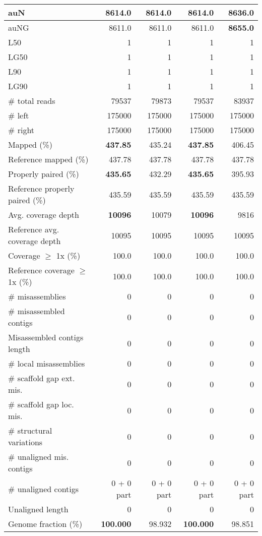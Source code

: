 \documentclass[12pt,a4paper]{article}
\begin{document}
\begin{table}[ht]
\begin{center}
\begin{tabular}{|l*{4}{|r}|}
auN & 8614.0 & 8614.0 & 8614.0 & {\bf 8636.0} \\ \hline
auNG & 8611.0 & 8611.0 & 8611.0 & {\bf 8655.0} \\ \hline
L50 & 1 & 1 & 1 & 1 \\ \hline
LG50 & 1 & 1 & 1 & 1 \\ \hline
L90 & 1 & 1 & 1 & 1 \\ \hline
LG90 & 1 & 1 & 1 & 1 \\ \hline
\# total reads & 79537 & 79873 & 79537 & 83937 \\ \hline
\# left & 175000 & 175000 & 175000 & 175000 \\ \hline
\# right & 175000 & 175000 & 175000 & 175000 \\ \hline
Mapped (\%) & {\bf 437.85} & 435.24 & {\bf 437.85} & 406.45 \\ \hline
Reference mapped (\%) & 437.78 & 437.78 & 437.78 & 437.78 \\ \hline
Properly paired (\%) & {\bf 435.65} & 432.29 & {\bf 435.65} & 395.93 \\ \hline
Reference properly paired (\%) & 435.59 & 435.59 & 435.59 & 435.59 \\ \hline
Avg. coverage depth & {\bf 10096} & 10079 & {\bf 10096} & 9816 \\ \hline
Reference avg. coverage depth & 10095 & 10095 & 10095 & 10095 \\ \hline
Coverage $\geq$ 1x (\%) & 100.0 & 100.0 & 100.0 & 100.0 \\ \hline
Reference coverage $\geq$ 1x (\%) & 100.0 & 100.0 & 100.0 & 100.0 \\ \hline
\# misassemblies & 0 & 0 & 0 & 0 \\ \hline
\# misassembled contigs & 0 & 0 & 0 & 0 \\ \hline
Misassembled contigs length & 0 & 0 & 0 & 0 \\ \hline
\# local misassemblies & 0 & 0 & 0 & 0 \\ \hline
\# scaffold gap ext. mis. & 0 & 0 & 0 & 0 \\ \hline
\# scaffold gap loc. mis. & 0 & 0 & 0 & 0 \\ \hline
\# structural variations & 0 & 0 & 0 & 0 \\ \hline
\# unaligned mis. contigs & 0 & 0 & 0 & 0 \\ \hline
\# unaligned contigs & 0 + 0 part & 0 + 0 part & 0 + 0 part & 0 + 0 part \\ \hline
Unaligned length & 0 & 0 & 0 & 0 \\ \hline
Genome fraction (\%) & {\bf 100.000} & 98.932 & {\bf 100.000} & 98.851 \\ \hline

\end{tabular}
\end{center}
\end{table}
\end{document}
